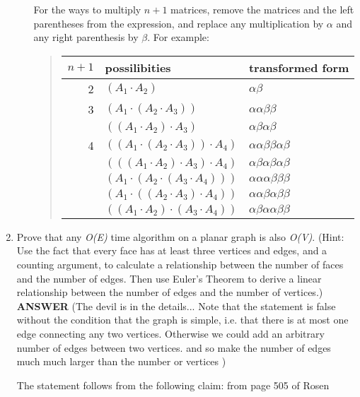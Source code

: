 \documentclass{article}
\begin{document}
\begin{enumerate}
\begin{enumerate}
For the ways to multiply $n+1$ matrices, remove the matrices and
the left parentheses from the expression, and replace any
multiplication by $\alpha$ and any right parenthesis by $\beta$.
For example:
\begin{quote}
\begin{tabular}{r|l|l}
$n+1$ & possilibities & transformed form\\
\hline
2   &   $(A_1 \cdot A_2)$ & $ \alpha \beta $\\
\hline
3   &   $(A_1 \cdot (A_2 \cdot A_3))$  & $\alpha \alpha \beta \beta $\\
    &   $((A_1 \cdot A_2) \cdot A_3)$  &  $\alpha \beta \alpha \beta $\\
\hline
4   &   $((A_1 \cdot (A_2 \cdot A_3)) \cdot A_4)$ & $\alpha \alpha \beta \beta \alpha \beta $\\
    &   $(((A_1 \cdot A_2) \cdot A_3) \cdot A_4)$ & $\alpha \beta \alpha \beta \alpha \beta $\\
    &   $(A_1 \cdot (A_2 \cdot (A_3 \cdot A_4)))$ & $\alpha \alpha \alpha \beta \beta \beta $\\
    &   $(A_1 \cdot ((A_2 \cdot A_3) \cdot A_4))$ & $\alpha \alpha \beta \alpha  \beta \beta $\\
    &   $((A_1 \cdot A_2) \cdot (A_3 \cdot A_4))$ & $\alpha \beta \alpha \alpha \beta \beta $\\
\end{tabular}
\end{quote}


\end{enumerate}

\item
Prove that any \textit{O({\textbar}E{\textbar})} time algorithm on
a planar graph is also \textit{O({\textbar}V{\textbar})}. (Hint:
Use the fact that every face has at least three vertices and
edges, and a counting argument, to calculate a relationship
between the number of faces and the number of edges. Then use
Euler's Theorem to derive a linear relationship between the number
of edges and the number of vertices.) \vskip 10pt  \textbf{ANSWER}
(The devil is in the details... Note that the statement is false
without the condition that the graph is simple, i.e. that there is
at most one edge connecting any two vertices. Otherwise we could
add an arbitrary number of edges between two vertices. and so make
the number of edges much much larger than the number or vertices )

The statement follows from the following claim: from page 505 of Rosen\\


\end{enumerate}
\end{document}
